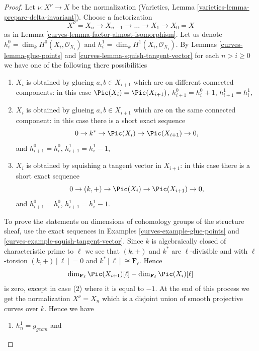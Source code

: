 \begin{proof}

Let $\nu : X^\nu \to X$ be the normalization
(Varieties, Lemma \ref{varieties-lemma-prepare-delta-invariant}).
Choose a factorization
$$
X^\nu = X_n \to X_{n - 1} \to \ldots \to X_1 \to X_0 = X
$$
as in Lemma \ref{curves-lemma-factor-almost-isomorphism}.
Let us denote $h^0_i = \dim_k H^0(X_i, \mathcal{O}_{X_i})$
and $h^1_i = \dim_k H^1(X_i, \mathcal{O}_{X_i})$.
By Lemmas \ref{curves-lemma-glue-points} and \ref{curves-lemma-squish-tangent-vector}
for each $n > i \geq 0$ we have
one of the following there possibilities
\begin{enumerate}
\item $X_i$ is obtained by glueing $a, b \in X_{i + 1}$
which are on different connected components: in this case
$\Pic(X_i) = \Pic(X_{i + 1})$,
$h^0_{i + 1} = h^0_i + 1$, $h^1_{i + 1} = h^1_i$,
\item $X_i$ is obtained by glueing $a, b \in X_{i + 1}$
which are on the same connected component: in this case
there is a short exact sequence
$$
0 \to k^* \to \Pic(X_i) \to \Pic(X_{i + 1}) \to 0,
$$
and $h^0_{i + 1} = h^0_i$, $h^1_{i + 1} = h^1_i - 1$,
\item $X_i$ is obtained by squishing a tangent vector in $X_{i + 1}$:
in this case there is a short exact sequence
$$
0 \to (k, +) \to \Pic(X_i) \to \Pic(X_{i + 1}) \to 0,
$$
and $h^0_{i + 1} = h^0_i$, $h^1_{i + 1} = h^1_i - 1$.
\end{enumerate}
To prove the statements on dimensions of cohomology groups of the
structure sheaf, use the exact sequences in
Examples \ref{curves-example-glue-points} and \ref{curves-example-squish-tangent-vector}.
Since $k$ is algebraically closed of characteristic prime to $\ell$
we see that $(k, +)$ and $k^*$ are $\ell$-divisible and with
$\ell$-torsion $(k, +)[\ell] = 0$ and $k^*[\ell] \cong \mathbf{F}_\ell$.
Hence
$$
\dim_{\mathbf{F}_\ell} \Pic(X_{i + 1})[\ell] -
\dim_{\mathbf{F}_\ell}\Pic(X_i)[\ell]
$$
is zero, except in case (2) where it is equal to $-1$.
At the end of this process we get the normalization
$X^\nu = X_n$ which is a disjoint union of smooth projective
curves over $k$. Hence we have
\begin{enumerate}
\item $h^1_n = g_{geom}$ and

\end{enumerate}
\end{proof}
